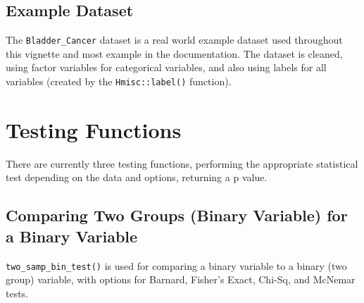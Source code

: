 \documentclass[table]{article}
\newenvironment{Shaded}{\begin{snugshade}}{\end{snugshade}}
\newcommand{\CommentTok}[1]{\textcolor[rgb]{0.56,0.35,0.01}{\textit{#1}}}
\newcommand{\DataTypeTok}[1]{\textcolor[rgb]{0.13,0.29,0.53}{#1}}
\newcommand{\KeywordTok}[1]{\textcolor[rgb]{0.13,0.29,0.53}{\textbf{#1}}}
\newcommand{\NormalTok}[1]{#1}
\newcommand{\OperatorTok}[1]{\textcolor[rgb]{0.81,0.36,0.00}{\textbf{#1}}}
\newcommand{\StringTok}[1]{\textcolor[rgb]{0.31,0.60,0.02}{#1}}
\begin{document}
\hypertarget{example-dataset}{%
\subsection{Example Dataset}\label{example-dataset}}

The \texttt{Bladder\_Cancer} dataset is a real world example dataset
used throughout this vignette and most example in the documentation. The
dataset is cleaned, using factor variables for categorical variables,
and also using labels for all variables (created by the
\texttt{Hmisc::label()} function).

\hypertarget{testing-functions}{%
\section{Testing Functions}\label{testing-functions}}

There are currently three testing functions, performing the appropriate
statistical test depending on the data and options, returning a p value.

\hypertarget{comparing-two-groups-binary-variable-for-a-binary-variable}{%
\subsection{Comparing Two Groups (Binary Variable) for a Binary
Variable}\label{comparing-two-groups-binary-variable-for-a-binary-variable}}

\texttt{two\_samp\_bin\_test()} is used for comparing a binary variable
to a binary (two group) variable, with options for Barnard, Fisher's
Exact, Chi-Sq, and McNemar tests.

\begin{Shaded}
\end{Shaded}
\end{document}
